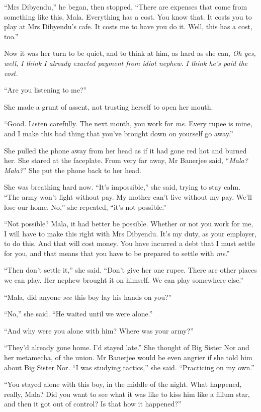 ``Mrs Dibyendu,'' he began, then stopped. ``There are expenses that
come from something like this, Mala. Everything has a cost. You
know that. It costs you to play at Mrs Dibyendu's cafe. It costs me
to have you do it. Well, this has a cost, too.''

Now it was her turn to be quiet, and to think at him, as hard as
she can,
\emph{Oh yes, well, I think I already exacted payment from idiot nephew. I think he's paid the cost.}

``Are you listening to me?''

She made a grunt of assent, not trusting herself to open her
mouth.

``Good. Listen carefully. The next month, you work for \emph{me}.
Every rupee is mine, and I make this bad thing that you've brought
down on yourself go away.''

She pulled the phone away from her head as if it had gone red hot
and burned her. She stared at the faceplate. From very far away, Mr
Banerjee said, ``\emph{Mala?} \emph{Mala?}'' She put the phone back
to her head.

She was breathing hard now. ``It's impossible,'' she said, trying to
stay calm. ``The army won't fight without pay. My mother can't live
without my pay. We'll lose our home. No,'' she repeated, ``it's not
possible.''

``Not possible? Mala, it had better be possible. Whether or not you
work for me, I will have to make this right with Mrs Dibyendu. It's
my duty, as your employer, to do this. And that will cost money.
You have incurred a debt that I must settle for you, and that means
that you have to be prepared to settle with \emph{me}.''

``Then don't settle it,'' she said. ``Don't give her one rupee. There
are other places we can play. Her nephew brought it on himself. We
can play somewhere else.''

``Mala, did anyone \emph{see} this boy lay his hands on you?''

``No,'' she said. ``He waited until we were alone.''

``And why were you alone with him? Where was your army?''

``They'd already gone home. I'd stayed late.'' She thought of Big
Sister Nor and her metamecha, of the union. Mr Banerjee would be
even angrier if she told him about Big Sister Nor. ``I was studying
tactics,'' she said. ``Practicing on my own.''

``You stayed alone with this boy, in the middle of the night. What
happened, really, Mala? Did you want to see what it was like to
kiss him like a fillum star, and then it got out of control? Is
that how it happened?''

